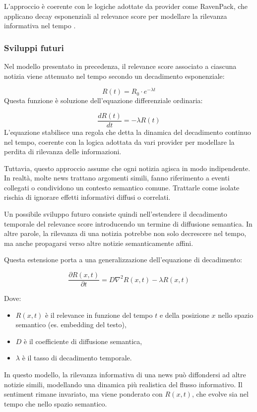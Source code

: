 \documentclass[a4paper,12pt]{article}
\begin{document}
L'approccio è coerente con le logiche adottate da provider come RavenPack, che applicano decay esponenziali al relevance score per modellare la rilevanza informativa nel tempo \parencite{ravenpack_relevance, ravenpack_forex, ravenpack_credit}.
\subsubsection{Sviluppi futuri}

Nel modello presentato in precedenza, il relevance score associato a ciascuna notizia viene attenuato nel tempo secondo un decadimento esponenziale:

\[
R(t) = R_0 \cdot e^{-\lambda t}
\]
Questa funzione è soluzione dell'equazione differenziale ordinaria:

\[
\frac{dR(t)}{dt} = -\lambda R(t)
\]
L'equazione stabilisce una regola che detta la dinamica del decadimento continuo nel tempo, coerente con la logica adottata da vari provider per modellare la perdita di rilevanza delle informazioni.

Tuttavia, questo approccio assume che ogni notizia agisca in modo indipendente. In realtà, molte news trattano argomenti simili, fanno riferimento a eventi collegati o condividono un contesto semantico comune. Trattarle come isolate rischia di ignorare effetti informativi diffusi o correlati.

Un possibile sviluppo futuro consiste quindi nell’estendere il decadimento temporale del relevance score introducendo un termine di diffusione semantica. In altre parole, la rilevanza di una notizia potrebbe non solo decrescere nel tempo, ma anche propagarsi verso altre notizie semanticamente affini.

Questa estensione porta a una generalizzazione dell’equazione di decadimento:

\[
\frac{\partial R(x, t)}{\partial t} = D \nabla^2 R(x, t) - \lambda R(x, t)
\]

Dove:
\begin{itemize}
  \item $R(x, t)$ è il relevance in funzione del tempo $t$ e della posizione $x$ nello spazio semantico (es. embedding del testo),
  \item $D$ è il coefficiente di diffusione semantica,
  \item $\lambda$ è il tasso di decadimento temporale.
\end{itemize}

In questo modello, la rilevanza informativa di una news può diffondersi ad altre notizie simili, modellando una dinamica più realistica del flusso informativo. Il sentiment rimane invariato, ma viene ponderato con $R(x, t)$, che evolve sia nel tempo che nello spazio semantico.
\end{document}
